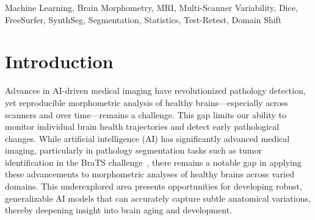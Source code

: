 \documentclass{midl} %
\begin{document}
\begin{abstract}
Our results reveal up to 7--8\% variation in the volumes of small subcortical structures such as the amygdala and ventral diencephalon, even under controlled test--retest conditions. This level of noise raises a critical question: can we reliably detect subtle longitudinal changes of 5--10\% in small brain regions with volumes below 2~milliliters, given the magnitude of scanner- and site-induced morphometric variability? We further analyze how registration choices and interpolation modes contribute additional, although smaller, biases, and we show that surface-based quality filtering can remove outlier segmentations while preserving most scans and maintaining morphometric stability. This work provides a reproducible benchmark of modern FreeSurfer-based segmentation pipelines and highlights the need for harmonization and quality-control strategies to enable robust morphometry in real-world neuroimaging studies.

The code is available
on~\url{github.com/kondratevakate/brain-mri-segmentation}


\end{abstract}

\begin{keywords}
Machine Learning, Brain Morphometry, MRI, Multi-Scanner Variability, Dice, FreeSurfer, SynthSeg, Segmentation, Statistics, Test-Retest, Domain Shift
\end{keywords}

\section{Introduction}


Advances in AI-driven medical imaging have revolutionized pathology detection, yet reproducible morphometric analysis of healthy brains---especially across scanners and over time---remains a challenge. This gap limits our ability to monitor individual brain health trajectories and detect early pathological changes. While artificial intelligence (AI) has significantly advanced medical imaging, particularly in pathology segmentation tasks such as tumor identification in the BraTS challenge~\cite{menze2015multimodal}, there remains a notable gap in applying these advancements to morphometric analyses of healthy brains across varied domains. This underexplored area presents opportunities for developing robust, generalizable AI models that can accurately capture subtle anatomical variations, thereby deepening insight into brain aging and development.
\end{document}
